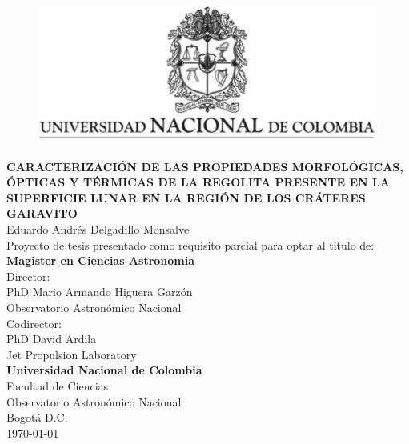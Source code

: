 \documentclass[12pt]{article}
\begin{document}
\newpage
\begin{titlepage}
    \thispagestyle{empty}
    \begin{center}
        \begin{figure}
        \centering%
        \includegraphics{images/EscudoUN.png}
    \end{figure}
    
    \vspace{1cm}
    
        \textbf{CARACTERIZACIÓN DE LAS PROPIEDADES MORFOLÓGICAS, ÓPTICAS Y 
        TÉRMICAS DE LA REGOLITA PRESENTE EN LA SUPERFICIE LUNAR EN LA REGIÓN 
        DE LOS CRÁTERES GARAVITO}\\[1in]    
    Eduardo Andrés Delgadillo Monsalve \\  [1.5 cm]
 Proyecto de tesis presentado como requisito parcial para optar al titulo de:\\[3mm]
 \textbf {\large{Magister en Ciencias Astronomia}}\\[1cm]
 Director:\\[3mm] PhD Mario Armando Higuera Garzón\\[1mm] 
 Observatorio Astronómico Nacional\\[1cm]
 Codirector:\\[3mm] PhD David Ardila\\ Jet Propulsion Laboratory\\[1in]
 \textbf{Universidad Nacional de Colombia}\\
 Facultad de Ciencias\\
 Observatorio Astronómico Nacional\\
 Bogotá D.C.\\
 \today
    \end{center}
\end{titlepage}
\newpage
\thispagestyle{empty}
\tableofcontents
\thispagestyle{empty}

\newpage
\listoffigures
\listoftables

\newpage
\setcounter{page}{1}
\end{document}
